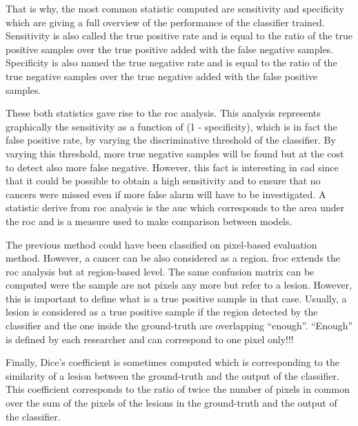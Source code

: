 That is why, the most common statistic computed are sensitivity and specificity which are giving a full overview of the performance of the classifier trained. Sensitivity is also called the true positive rate and is equal to the ratio of the true positive samples over the true positive added with the false negative samples. Specificity is also named the true negative rate and is equal to the ratio of the true negative samples over the true negative added with the false positive samples.

These both statistics gave rise to the \acf{roc} analysis. This analysis represents graphically the sensitivity as a function of (1 - specificity), which is in fact the false positive rate, by varying the discriminative threshold of the classifier. By varying this threshold, more true negative samples will be found but at the cost to detect also more false negative. However, this fact is interesting in \ac{cad} since that it could be possible to obtain a high sensitivity and to ensure that no cancers were missed even if more false alarm will have to be investigated. A statistic derive from \ac{roc} analysis is the \acf{auc} which corresponds to the area under the \ac{roc} and is a measure used to make comparison between models. 

The previous method could have been classified on pixel-based evaluation method. However, a cancer can be also considered as a region. \Acf{froc} extends the \ac{roc} analysis but at region-based level. The same confusion matrix can be computed were the sample are not pixels any more but refer to a lesion. However, this is important to define what is a true positive sample in that case. Usually, a lesion is considered as a true positive sample if the region detected by the classifier and the one inside the ground-truth are overlapping ``enough''. ``Enough'' is defined by each researcher and can correspond to one pixel only!!!

Finally, Dice's coefficient is sometimes computed which is corresponding to the similarity of a lesion between the ground-truth and the output of the classifier. This coefficient corresponds to the ratio of twice the number of pixels in common over the sum of the pixels of the lesions in the ground-truth and the output of the classifier.